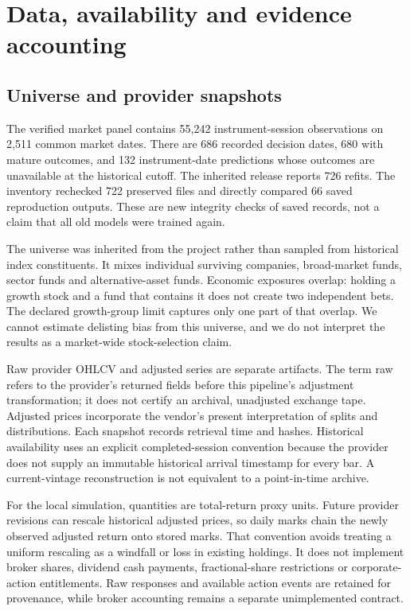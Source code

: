 \section{Data, availability and evidence accounting}\label{sec:section-03}

\subsection{Universe and provider snapshots}

The verified market panel contains 55,242 instrument-session observations on 2,511 common market dates. There are 686 recorded decision dates, 680 with mature outcomes, and 132 instrument-date predictions whose outcomes are unavailable at the historical cutoff. The inherited release reports 726 refits. The inventory rechecked 722 preserved files and directly compared 66 saved reproduction outputs. These are new integrity checks of saved records, not a claim that all old models were trained again.

The universe was inherited from the project rather than sampled from historical index constituents. It mixes individual surviving companies, broad-market funds, sector funds and alternative-asset funds. Economic exposures overlap: holding a growth stock and a fund that contains it does not create two independent bets. The declared growth-group limit captures only one part of that overlap. We cannot estimate delisting bias from this universe, and we do not interpret the results as a market-wide stock-selection claim.

Raw provider OHLCV and adjusted series are separate artifacts. The term raw refers to the provider's returned fields before this pipeline's adjustment transformation; it does not certify an archival, unadjusted exchange tape. Adjusted prices incorporate the vendor's present interpretation of splits and distributions. Each snapshot records retrieval time and hashes. Historical availability uses an explicit completed-session convention because the provider does not supply an immutable historical arrival timestamp for every bar. A current-vintage reconstruction is not equivalent to a point-in-time archive.

For the local simulation, quantities are total-return proxy units. Future provider revisions can rescale historical adjusted prices, so daily marks chain the newly observed adjusted return onto stored marks. That convention avoids treating a uniform rescaling as a windfall or loss in existing holdings. It does not implement broker shares, dividend cash payments, fractional-share restrictions or corporate-action entitlements. Raw responses and available action events are retained for provenance, while broker accounting remains a separate unimplemented contract.

